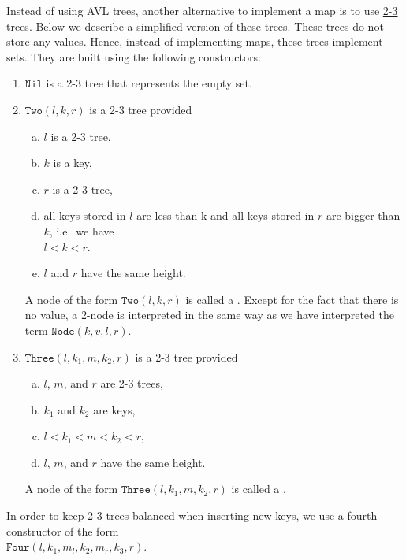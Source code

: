 \exercise
Instead of using AVL trees, another alternative to implement a map is to use 
\href{https://en.wikipedia.org/wiki/2-3_tree}{2-3 trees}.  
Below we describe a simplified version of these trees.  These trees do not store any values.  Hence, instead
of implementing maps, these trees implement sets. They are built using the following constructors:
\begin{enumerate}
\item $\mathtt{Nil}$ is a 2-3 tree that represents the empty set.
\item $\mathtt{Two}(l, k, r)$ is a 2-3 tree provided
      \begin{enumerate}[(a)]
      \item $l$ is a 2-3 tree,
      \item $k$ is a key,
      \item $r$ is a 2-3 tree,
      \item all keys stored in $l$ are less than k and all keys stored in $r$ are bigger than $k$,
            i.e.~we have
            \\[0.2cm]
            \hspace*{1.3cm}
            $l < k < r$.
      \item $l$ and $r$ have the same height.
      \end{enumerate}
      A node of the form  $\mathtt{Two}(l, k, r)$ is called a .  Except for the fact
      that there is no value, a 2-node is
      interpreted in the same way as we have interpreted the term $\mathtt{Node}(k, v, l, r)$.
\item $\mathtt{Three}(l, k_1, m, k_2, r)$ is a 2-3 tree provided
      \begin{enumerate}[(a)]
      \item $l$, $m$, and $r$ are 2-3 trees,
      \item $k_1$ and $k_2$ are keys,
      \item $l < k_1 < m < k_2 < r$,
      \item $l$, $m$, and $r$ have the same height.
      \end{enumerate}
      A node of the form  $\mathtt{Three}(l, k_1, m, k_2, r)$ is called a .
\end{enumerate}
In order to keep 2-3 trees balanced when inserting new keys, we use a fourth constructor of the form
\\[0.2cm]
\hspace*{1.3cm}
$\mathtt{Four}(l,k_1,m_l, k_2, m_r, k_3, r)$.
\\[0.2cm]
